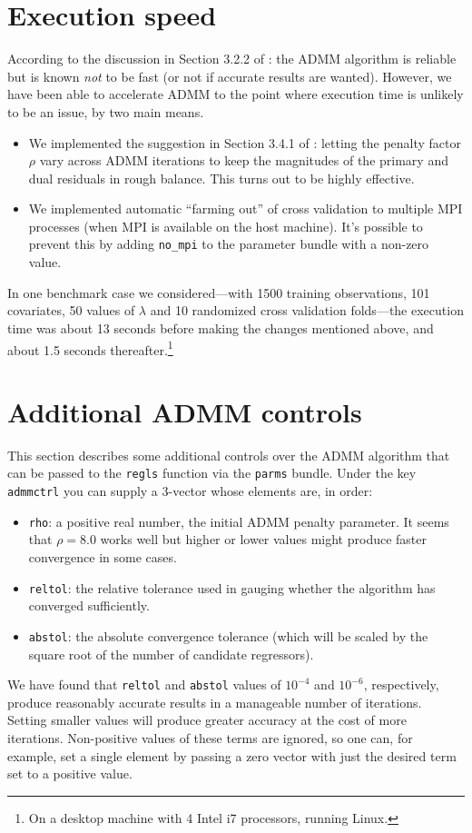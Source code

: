 \documentclass{article}
\begin{document}
\section{Execution speed}
\label{sec:speed}

According to the discussion in Section 3.2.2 of \cite{boyd2010}: the
ADMM algorithm is reliable but is known \textit{not} to be fast (or
not if accurate results are wanted). However, we have been able to
accelerate ADMM to the point where execution time is unlikely to be an
issue, by two main means.
\begin{itemize}
\item We implemented the suggestion in Section 3.4.1 of
  \cite{boyd2010}: letting the penalty factor $\rho$ vary across ADMM
  iterations to keep the magnitudes of the primary and dual residuals
  in rough balance. This turns out to be highly effective.
\item We implemented automatic ``farming out'' of cross validation to
  multiple \textsf{MPI} processes (when \textsf{MPI} is available on
  the host machine). It's possible to prevent this by adding
  \texttt{no\_mpi} to the parameter bundle with a non-zero value.
\end{itemize}
In one benchmark case we considered---with 1500 training observations,
101 covariates, 50 values of $\lambda$ and 10 randomized cross
validation folds---the execution time was about 13 seconds before
making the changes mentioned above, and about 1.5 seconds
thereafter.\footnote{On a desktop machine with 4 Intel i7 processors,
  running Linux.}

\section{Additional ADMM controls}
\label{sec:add-controls}

This section describes some additional controls over the ADMM
algorithm that can be passed to the \texttt{regls} function via the
\texttt{parms} bundle. Under the key \texttt{admmctrl} you can supply
a 3-vector whose elements are, in order:
\begin{itemize}
\item \texttt{rho}: a positive real number, the initial ADMM penalty
  parameter. It seems that $\rho = 8.0$ works well but higher or lower
  values might produce faster convergence in some cases.
\item \texttt{reltol}: the relative tolerance used in gauging whether
  the algorithm has converged sufficiently.
\item \texttt{abstol}: the absolute convergence tolerance (which will
  be scaled by the square root of the number of candidate regressors).
\end{itemize}
We have found that \texttt{reltol} and \texttt{abstol} values of
$10^{-4}$ and $10^{-6}$, respectively, produce reasonably accurate
results in a manageable number of iterations. Setting smaller values
will produce greater accuracy at the cost of more iterations.
Non-positive values of these terms are ignored, so one can, for
example, set a single element by passing a zero vector with just the
desired term set to a positive value.
\end{document}
